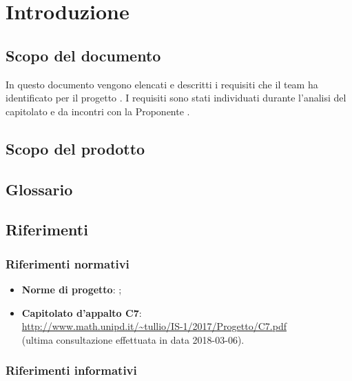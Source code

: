 \section{Introduzione} \label{introduzione}

    \subsection{Scopo del documento}

        In questo documento vengono elencati e descritti i requisiti che il team ha identificato per il	progetto \ProjectName.
        I requisiti sono stati individuati durante l'analisi del capitolato e da incontri con la Proponente	\Proponente.

    \subsection{Scopo del prodotto}

        \ScopoProdotto{}

    \subsection{Glossario}

        \DescrizioneGlossario{}

    \subsection{Riferimenti}

        \subsubsection{Riferimenti normativi}

            \begin{itemize}
	            \item
	                \textbf{Norme di progetto}: \vNormeDiProgetto{};

	            \item
	                \textbf{Capitolato d'appalto C7}: \\
		            \url{http://www.math.unipd.it/~tullio/IS-1/2017/Progetto/C7.pdf} \\
		            (ultima consultazione effettuata in data 2018-03-06).
            \end{itemize}

        \subsubsection{Riferimenti informativi}

